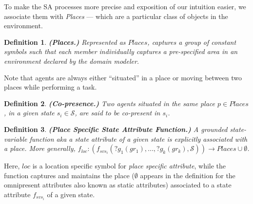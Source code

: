 \documentclass[letterpaper]{article} %
\newtheorem{definition}{Definition}
\begin{document}
To make the SA processes more precise and exposition of our intuition easier, we associate them with  \textit{Places} --- which are a particular class of objects in the environment. 

\begin{definition} \label{def:places}
\textbf{(Places.)} Represented as $\mathit{Places}$, captures a group of constant symbols such that each member individually captures a pre-specified area in an environment declared by the domain modeler.  
\end{definition}


Note that agents are always either ``situated'' in a place or moving between two places while performing a task. 

\begin{definition} \label{def:copresence}
\textbf{(Co-presence.)} Two agents situated in the same place $p \in \mathit{Places}$, in a given state $s_i \in \mathcal{S}$, are said to be \textit{co-present} in $s_i$.
\end{definition}


\begin{definition} \label{def:pssav}
    \textbf{(Place Specific State Attribute Function.)} A {\em grounded} state-variable function {\em aka} a state attribute of a given state is explicitly associated with a place. More generally, 
    $f_{loc}: (f_{svs_i}(?g_1(gr_1),...,?g_k(gr_k),\mathcal{S})) \rightarrow Places \cup \emptyset$.
\end{definition}
Here, $\mathit{loc}$ is a location specific symbol for {\em place specific attribute}, while the function captures and maintains the place ($\emptyset$ appears in the definition for the omnipresent attributes also known as static attributes) associated to a state attribute $f_{svs_i}$ of a given state.
\end{document}
